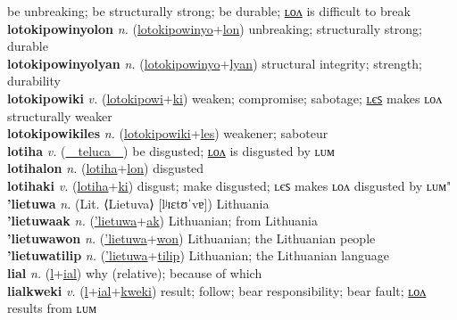 be unbreaking; be structurally strong; be durable; \hyperref[lotokipowinyolon]{ʟᴏᴧ} is difficult to break \label{lotokipowinyo} \\
\textbf{lotokipowinyolon} \textit{n.} (\hyperref[lotokipowinyo]{lotokipowinyo}+\hyperref[lon]{lon})
unbreaking; structurally strong; durable \label{lotokipowinyolon} \\
\textbf{lotokipowinyolyan} \textit{n.} (\hyperref[lotokipowinyo]{lotokipowinyo}+\hyperref[lyan]{lyan})
structural integrity; strength; durability \label{lotokipowinyolyan} \\
\textbf{lotokipowiki} \textit{v.} (\hyperref[lotokipowi]{lotokipowi}+\hyperref[ki]{ki})
weaken; compromise; sabotage; \hyperref[lotokipowikiles]{ʟєꜱ} makes ʟᴏᴧ structurally weaker \label{lotokipowiki} \\
\textbf{lotokipowikiles} \textit{n.} (\hyperref[lotokipowiki]{lotokipowiki}+\hyperref[les]{les})
weakener; saboteur \label{lotokipowikiles} \\
\textbf{lotiha} \textit{v.} (\hyperref[teluca]{~~teluca~~})
be disgusted; \hyperref[lotihalon]{ʟᴏᴧ} is disgusted by ʟᴜᴍ \label{lotiha} \\
\textbf{lotihalon} \textit{n.} (\hyperref[lotiha]{lotiha}+\hyperref[lon]{lon})
disgusted \label{lotihalon} \\
\textbf{lotihaki} \textit{v.} (\hyperref[lotiha]{lotiha}+\hyperref[ki]{ki})
disgust; make disgusted; ʟєꜱ makes ʟᴏᴧ disgusted by ʟᴜᴍ" \label{lotihaki} \\
\textbf{'lietuwa} \textit{n.} (Lit. ⟨Lietuva⟩ [lʲɪɛtʊˈvɐ])
Lithuania \label{'lietuwa} \\
\textbf{'lietuwaak} \textit{n.} (\hyperref['lietuwa]{'lietuwa}+\hyperref[ak]{ak})
Lithuanian; from Lithuania \label{'lietuwaak} \\
\textbf{'lietuwawon} \textit{n.} (\hyperref['lietuwa]{'lietuwa}+\hyperref[won]{won})
Lithuanian; the Lithuanian people \label{'lietuwawon} \\
\textbf{'lietuwatilip} \textit{n.} (\hyperref['lietuwa]{'lietuwa}+\hyperref[tilip]{tilip})
Lithuanian; the Lithuanian language \label{'lietuwatilip} \\
\textbf{lial} \textit{n.} (\hyperref[l]{l}+\hyperref[al]{ial})
why (relative); because of which \label{lial} \\
\textbf{lialkweki} \textit{v.} (\hyperref[l]{l}+\hyperref[ial]{ial}+\hyperref[kweki]{kweki})
result; follow; bear responsibility; bear fault; \hyperref[lialkwekilon]{ʟᴏᴧ} results from ʟᴜᴍ \label{lialkweki} \\
